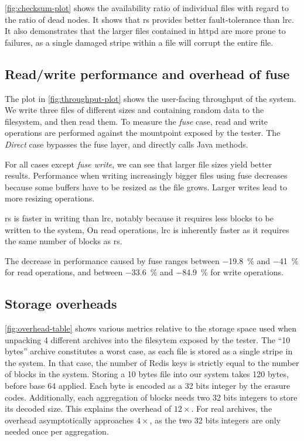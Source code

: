 \autoref{fig:checksum-plot} shows the availability ratio of individual files with regard to the ratio of dead nodes.
It shows that \ac{rs} provides better fault-tolerance than \ac{lrc}.
It also demonstrates that the larger files contained in httpd are more prone to failures, as a single damaged stripe within a file will corrupt the entire file.

\subsection{Read/write performance and overhead of \acs{fuse}}
\label{subsec:rw-perf}

The plot in \autoref{fig:throughput-plot} shows the user-facing throughput of the system.
We write three files of different sizes and containing random data to the filesystem, and then read them.
To measure the \textit{\ac{fuse}} case, read and write operations are performed against the mountpoint exposed by the tester.
The \textit{Direct} case bypasses the \ac{fuse} layer, and directly calls Java methods.

For all cases except \textit{\ac{fuse} write}, we can see that larger file sizes yield better results.
Performance when writing increasingly bigger files using \ac{fuse} decreases because some buffers have to be resized as the file grows.
Larger writes lead to more resizing operations.

\ac{rs} is faster in writing than \ac{lrc}, notably because it requires less blocks to be written to the system,
On read operations, \ac{lrc} is inherently faster as it requires the same number of blocks as \ac{rs}.

The decrease in performance caused by \ac{fuse} ranges between \SI{-19.8}{\percent} and \SI{-41}{\percent} for read operations, and between \SI{-33.6}{\percent} and \SI{-84.9}{\percent} for write operations.

\subsection{Storage overheads}
\label{subsec:storage-overheads}

\autoref{fig:overhead-table} shows various metrics relative to the storage space used when unpacking 4 different archives into the filesytem exposed by the tester.
The \enquote{10 bytes} archive constitutes a worst case, as each file is stored as a single stripe in the system.
In that case, the number of Redis keys is strictly equal to the number of blocks in the system.
Storing a 10 bytes file into our system takes 120 bytes, before base 64 applied.
Each byte is encoded as a 32 bits integer by the erasure codes.
Additionally, each aggregation of blocks needs two 32 bits integers to store its decoded size.
This explains the overhead of $12\times$.
For real archives, the overhead asymptotically approaches $4\times$, as the two 32 bits integers are only needed once per aggregation.


